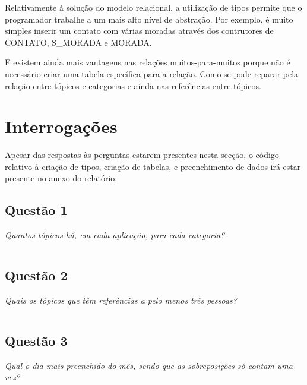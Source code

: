 \documentclass[a4paper,12pt]{article}
\begin{document}
	Relativamente à solução do modelo relacional, a utilização de tipos permite que o programador trabalhe a um mais alto nível de abstração. Por exemplo, é muito simples inserir um contato com várias moradas através dos contrutores de CONTATO, S\_MORADA e MORADA. 

	E existem ainda mais vantagens nas relações muitos-para-muitos porque não é necessário criar uma tabela específica para a relação. Como se pode reparar pela relação entre tópicos e categorias e ainda nas referências entre tópicos.  

\section{Interrogações}

	Apesar das respostas às perguntas estarem presentes nesta secção, o código relativo à criação de tipos, criação de tabelas, e preenchimento de dados irá estar presente no anexo do relatório.


\subsection{Questão 1}

	\emph{Quantos tópicos há, em cada aplicação, para cada categoria?}\\

	\inputminted{sql}{1.sql}

\subsection{Questão 2}

	\emph{Quais os tópicos que têm referências a pelo menos três pessoas?}\\

	\inputminted{sql}{2.sql}

\subsection{Questão 3}

	\emph{Qual o dia mais preenchido do mês, sendo que as sobreposições só contam uma vez?	}\\
\end{document}
